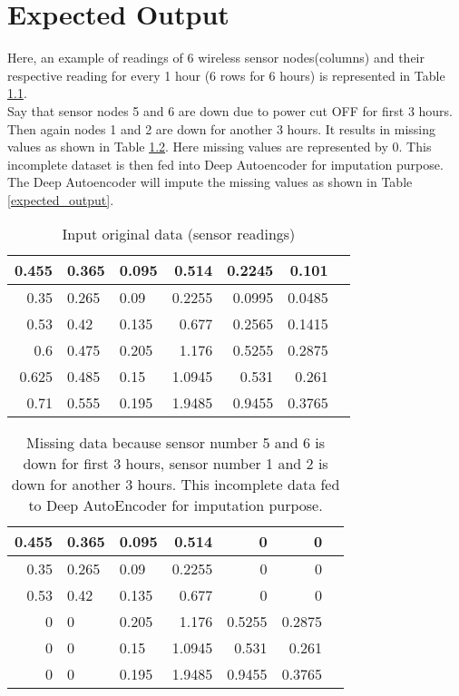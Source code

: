 \chapter{Expected Output}\label{ch:expectedoutput}
Here, an example of readings of 6 wireless sensor nodes(columns) and their respective reading for every 1 hour (6 rows for 6 hours) is represented in Table \ref{original_data}. 
\\
Say that sensor nodes 5 and 6 are down due to power cut OFF for first 3 hours. Then again nodes 1 and 2 are down for another 3 hours. It results in missing values as shown in Table \ref{incomplete_data}. Here missing values are represented by $0$. This incomplete dataset is then fed into Deep Autoencoder for imputation purpose. The Deep Autoencoder will impute the missing values as shown in Table \ref{expected_output}.
\begin{table} [htbp]
\caption{Input original data (sensor readings)}
\begin{tabular}{|r|l|l|r|r|r|l|}
\hline
\multicolumn{1}{|l|}{0.455} & 0.365 & 0.095 &  0.514 &  0.2245 & 0.101 \\ \hline
0.35 & 0.265 & 0.09 & 0.2255 & 0.0995 & 0.0485 \\ \hline
0.53 & 0.42 & 0.135 & 0.677 & 0.2565 & 0.1415  \\ \hline
0.6	 & 0.475 & 	0.205 & 	1.176 & 	0.5255 & 	0.2875\\ \hline
0.625  & 0.485 & 0.15 & 1.0945 & 0.531 & 0.261 \\ \hline
0.71 & 0.555 & 0.195 & 1.9485 & 0.9455 & 0.3765 \\ \hline

\end{tabular}
\label{original_data}
\end{table}

\begin{table} [htbp]
\caption{Missing data because sensor number 5 and 6 is down for first 3 hours, sensor number 1 and 2 is down for another 3 hours.  This incomplete data fed to Deep AutoEncoder for imputation purpose.}
\begin{tabular}{|r|l|l|r|r|r|l|}
\hline
\multicolumn{1}{|l|}{0.455} & 0.365 & 0.095 &  0.514 &  0 & 0 \\ \hline
0.35 & 0.265 & 0.09 & 0.2255 & 0 & 0  \\ \hline
0.53 & 0.42 & 0.135 & 0.677 & 0 & 0  \\ \hline
0 & 0 & 	0.205 & 	1.176 & 	0.5255 & 	0.2875 \\ \hline
0  & 0 & 0.15 & 1.0945 & 0.531 & 0.261 \\ \hline
0 & 0 & 0.195 & 1.9485 & 0.9455 & 0.3765\\ \hline

\end{tabular}
\label{incomplete_data}
\end{table}

